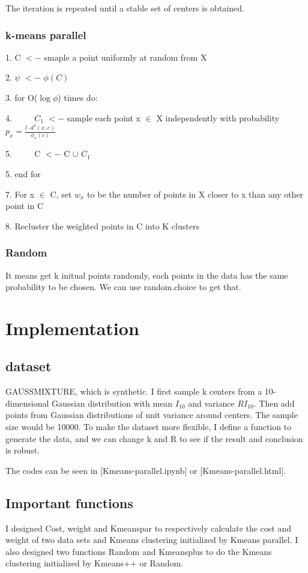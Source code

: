 \documentclass{article}
\begin{document}
\vspace{2 mm}
The iteration is repeated until a stable set of centers is obtained.
\subsubsection{k-means parallel}
1. C $<-$ smaple a point uniformly at random from X

2. $\psi$ $<-$ $\phi(C)$

3. for O($\log \phi$) times do:

4. $\qquad$ $C_1$ $<-$ sample each point x $\in$ X independently with probability $p_x =\frac{l \cdot d^2(x,c)}{\phi_x(c)}$ 

5. $\qquad$ C $<-$ C $\cup$ $C_1$

5. end for

7. For x $\in$ C, set $w_x$ to be the number of points in X closer to x than any other point in C

8. Recluster the weighted points in C into K clusters

\subsubsection{Random}
It means get k initual points randomly, each points in the data has the same probability to be chosen. We can use random.choice to get that.

\section{Implementation}
\subsection{dataset}
GAUSSMIXTURE, which is synthetic. I first sample k centers from a 10-dimensional Gaussian distribution with mean $I_{10}$ and variance $RI_{10}$. Then add points from Gaussian distributions of unit variance around centers. The sample size would be 10000. To make the dataset more flexible, I define a function to generate the data, and we can change k and R to see if the result and conclusion is robust.

\vspace{2 mm}
The codes can be seen in [Kmeans-parallel.ipynb] or [Kmeans-parallel.html].

\subsection{Important functions}
I designed Cost, weight and Kmeanspar to respectively calculate the 
cost and weight of two data sets and Kmeans clustering initialized by
Kmeans parallel. I also designed two functions Random and Kmeansplus to
do the Kmeans clustering initialized by Kmeans++ or Random. 
\end{document}

